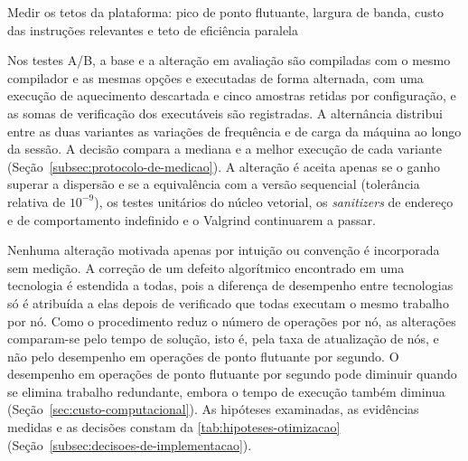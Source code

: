\begin{algorithm}[H]
    \caption{Ciclo de otimização orientado por hipóteses}\label{alg:ciclo-otimizacao}
    Medir os tetos da plataforma: pico de ponto flutuante, largura de banda, custo das instruções relevantes e teto de eficiência paralela\;
\end{algorithm}

Nos testes A/B, a base e a alteração em avaliação são compiladas com o mesmo compilador e as mesmas opções e executadas de forma alternada, com uma execução de aquecimento descartada e cinco amostras retidas por configuração, e as somas de verificação dos executáveis são registradas.
A alternância distribui entre as duas variantes as variações de frequência e de carga da máquina ao longo da sessão.
A decisão compara a mediana e a melhor execução de cada variante (Seção~\ref{subsec:protocolo-de-medicao}).
A alteração é aceita apenas se o ganho superar a dispersão e se a equivalência com a versão sequencial (tolerância relativa de $10^{-9}$), os testes unitários do núcleo vetorial, os \textit{sanitizers} de endereço e de comportamento indefinido e o Valgrind continuarem a passar.

Nenhuma alteração motivada apenas por intuição ou convenção é incorporada sem medição.
A correção de um defeito algorítmico encontrado em uma tecnologia é estendida a todas, pois a diferença de desempenho entre tecnologias só é atribuída a elas depois de verificado que todas executam o mesmo trabalho por nó.
Como o procedimento reduz o número de operações por nó, as alterações comparam-se pelo tempo de solução, isto é, pela taxa de atualização de nós, e não pelo desempenho em operações de ponto flutuante por segundo.
O desempenho em operações de ponto flutuante por segundo pode diminuir quando se elimina trabalho redundante, embora o tempo de execução também diminua (Seção~\ref{sec:custo-computacional}).
As hipóteses examinadas, as evidências medidas e as decisões constam da \autoref{tab:hipoteses-otimizacao} (Seção~\ref{subsec:decisoes-de-implementacao}).

